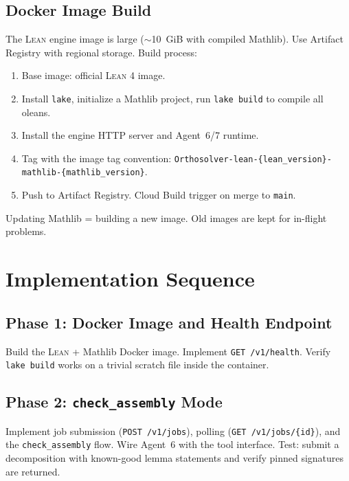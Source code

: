 \documentclass[11pt,a4paper]{article}
\newcommand{\Lean}{\textsc{Lean}}
\begin{document}
\subsection{Docker Image Build}

The \Lean{} engine image is large ($\sim$10~GiB with compiled Mathlib). Use Artifact Registry with regional storage. Build process:

\begin{enumerate}[leftmargin=2em]
  \item Base image: official \Lean{} 4 image.
  \item Install \texttt{lake}, initialize a Mathlib project, run \texttt{lake build} to compile all oleans.
  \item Install the engine HTTP server and Agent~6/7 runtime.
  \item Tag with the image tag convention: \texttt{Orthosolver-lean-\{lean\_version\}-mathlib-\{mathlib\_version\}}.
  \item Push to Artifact Registry. Cloud Build trigger on merge to \texttt{main}.
\end{enumerate}

Updating Mathlib = building a new image. Old images are kept for in-flight problems.

\section{Implementation Sequence}

\subsection{Phase 1: Docker Image and Health Endpoint}
Build the \Lean{} + Mathlib Docker image. Implement \texttt{GET /v1/health}. Verify \texttt{lake build} works on a trivial scratch file inside the container.

\subsection{Phase 2: \texttt{check\_assembly} Mode}
Implement job submission (\texttt{POST /v1/jobs}), polling (\texttt{GET /v1/jobs/\{id\}}), and the \texttt{check\_assembly} flow. Wire Agent~6 with the tool interface. Test: submit a decomposition with known-good lemma statements and verify pinned signatures are returned.
\end{document}
